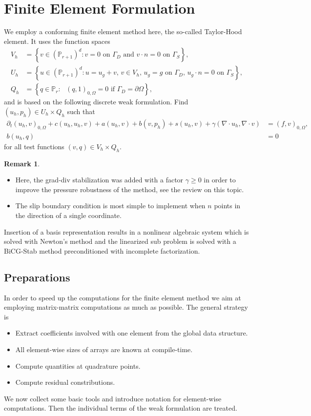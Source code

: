 \documentclass[a4paper,12pt]{article}
\theoremstyle{definition}
\newtheorem{Rem}[Def]{Remark}
\begin{document}
\section{Finite Element Formulation}

We employ a conforming finite element method here, the so-called Taylor-Hood element. It uses the function spaces
\begin{align}
V_h &= \left\{ v\in (\mathbb{P}_{r+1})^d : \text{$v=0$ on $\Gamma_D$ and $v\cdot n=0$ on $\Gamma_S$} \right\},\\
U_h &= \left\{ u\in (\mathbb{P}_{r+1})^d : \text{$u=u_g+v$, $v\in V_h$, $u_g=g$ on $\Gamma_D$, $u_g\cdot n=0$ on $\Gamma_S$} \right\},\\
Q_h &= \left\{ q\in \mathbb{P}_r : \text{ $(q,1)_{0,\Omega}=0$ if $\Gamma_D=\partial\Omega$} \right\},
\end{align}
and is based on the following discrete weak formulation. Find $(u_h,p_h)\in U_h\times Q_h$ such that
{\small\begin{align}
\partial_t (u_h,v)_{0,\Omega} + c(u_h,u_h,v) + a(u_h,v) + b(v,p_h) + s(u_h,v) + \gamma (\nabla\cdot u_h, \nabla\cdot v) &= (f,v)_{0,\Omega}, \\
b(u_h,q) &= 0
\end{align}}
for all test functions $(v,q) \in V_h\times Q_h$.
 
\begin{Rem}
\begin{itemize}
\item Here, the grad-div stabilization was added with a factor $\gamma\geq 0$ in order to improve the pressure
robustness of the method, see the review \cite{John_etal_2017} on this topic.
\item The slip boundary condition is most simple to implement when $n$ points in the direction of a single coordinate.
\end{itemize}
\end{Rem}
Insertion of a basis representation results in a nonlinear algebraic
system which is solved with Newton's method and the linearized sub
problem is solved with a BiCG-Stab method preconditioned with
incomplete factorization.

\subsection{Preparations}

In order to speed up the computations for the finite element method we
aim at employing matrix-matrix computations as much as possible. The
general strategy is
\begin{itemize}
  \item Extract coefficients involved with one element from the global
    data structure.
  \item All element-wise sizes of arrays are known at compile-time.
  \item Compute quantities at quadrature points.
  \item Compute residual constributions.
\end{itemize}
We now collect some basic tools and introduce notation for
element-wise computations. Then the individual terms of the weak
formulation are treated.
\end{document}
